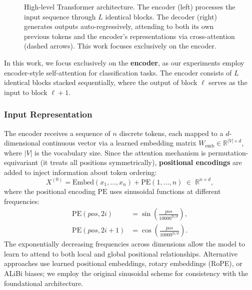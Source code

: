 \documentclass[12pt, a4paper]{article}
\begin{document}
\begin{figure}[H]
{%
}%
\caption{High-level Transformer architecture. The encoder (left)
processes the input sequence through $L$ identical blocks. The decoder
(right) generates outputs auto-regressively, attending to both its own
previous tokens and the encoder's representations via cross-attention
(dashed arrows). This work focuses exclusively on the encoder.}
\label{fig:transformer_arch}
\end{figure}

In this work, we focus exclusively on the \textbf{encoder}, as our
experiments employ encoder-style self-attention for classification tasks.
The encoder consists of $L$ identical blocks stacked sequentially, where
the output of block $\ell$ serves as the input to block $\ell + 1$.

\subsubsection{Input Representation}

The encoder receives a sequence of $n$ discrete tokens, each mapped to
a $d$-dimensional continuous vector via a learned embedding matrix
$W_{\text{emb}} \in \mathbb{R}^{|V| \times d}$, where $|V|$ is the
vocabulary size. Since the attention mechanism is permutation-equivariant
(it treats all positions symmetrically), \textbf{positional encodings}
are added to inject information about token ordering:
\begin{equation}
    X^{(0)} = \text{Embed}(x_1, \ldots, x_n) + \text{PE}(1, \ldots, n)
    \;\in\; \mathbb{R}^{n \times d},
    \label{eq:input_repr}
\end{equation}
where the positional encoding $\text{PE}$ uses sinusoidal functions at
different frequencies:
\begin{align}
    \text{PE}(pos, 2i) &= \sin\!\left(\frac{pos}{10000^{2i/d}}\right), \label{eq:pe_sin} \\
    \text{PE}(pos, 2i+1) &= \cos\!\left(\frac{pos}{10000^{2i/d}}\right). \label{eq:pe_cos}
\end{align}
The exponentially decreasing frequencies across dimensions allow the
model to learn to attend to both local and global positional
relationships. Alternative approaches use learned positional embeddings,
rotary embeddings (RoPE), or ALiBi biases; we employ the original
sinusoidal scheme for consistency with the foundational architecture.
\end{document}
